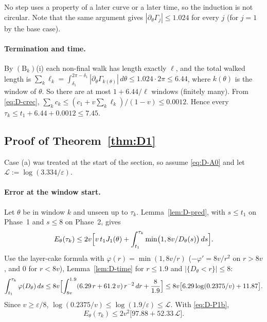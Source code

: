 \smallskip
No step uses a property of a later curve or a later time, so the induction is not circular. Note that the same argument
gives $|\partial_\theta\Gamma_j|\le1.024$ for every $j$ (for $j=1$ by the base case).

\paragraph{Termination and time.} By $(\mathrm B_k)$(i) each non-final walk has length exactly $\ell$, and the total walked
length is $\sum_k\ell_k=\int_{\delta_1}^{2\pi-\delta_1}|\partial_\theta\Gamma_{k(\theta)}|\,d\theta\le1.024\cdot2\pi\le6.44$, where
$k(\theta)$ is the window of $\theta$. So there are at most $1+6.44/\ell$ windows (finitely many). From \eqref{eq:D-crec},
$\sum_kc_k\le(c_1+v\sum_k\ell_k)/(1-v)\le0.0012$. Hence every $\tau_k\le t_1+6.44+0.0012\le7.45$.

\subsection{Proof of Theorem~\ref{thm:D1}}
Case (a) was treated at the start of the section, so assume \eqref{eq:D-A0} and let $\mathcal L:=\log(3.334/\varepsilon)$.

\paragraph{Error at the window start.} Let $\theta$ be in window $k$ and unseen up to $\tau_k$. Lemma~\ref{lem:D-pred}, with
$s\le t_1$ on Phase~1 and $s\le8$ on Phase~2, gives
\[
E_\theta(\tau_k)\le2v\Bigl[v\,t_1J_1(\theta)+\int_{t_1}^{\tau_k}\min\bigl(1,8v/D_\theta(s)\bigr)\,ds\Bigr].
\]
Use the layer-cake formula with $\varphi(r)=\min(1,8v/r)$ ($-\varphi'=8v/r^2$ on $r>8v$, and $0$ for $r<8v$), Lemma~\ref{lem:D-time}
for $r\le1.9$ and $|\{D_\theta<r\}|\le8$:
\[
\int_{t_1}^{\tau_k}\varphi(D_\theta)\,ds\le8v\Bigl[\int_{8v}^{1.9}(6.29\,r+61.2\,v)\,r^{-2}\,dr+\frac{8}{1.9}\Bigr]
\le8v\bigl[6.29\log(0.2375/v)+11.87\bigr].
\]
Since $v\ge\varepsilon/8$, $\log(0.2375/v)\le\log(1.9/\varepsilon)\le\mathcal L$. With \eqref{eq:D-P1b},
\begin{equation}\label{eq:D-err}
E_\theta(\tau_k)\le2v^2\bigl[97.88+52.33\,\mathcal L\bigr].
\end{equation}

